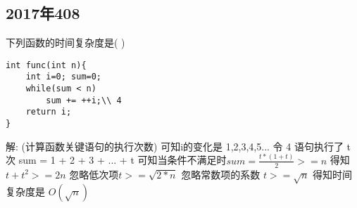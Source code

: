 \subsection{2017年408}
下列函数的时间复杂度是( )
\begin{lstlisting}[basicstyle=\small\ttfamily, caption={}, numbers=none]
int func(int n){
	int i=0; sum=0;
	while(sum < n) 
		sum += ++i;\\ 4
	return i;
}
\end{lstlisting}
解:\newline
{\color{red}(计算函数关键语句的执行次数)}\newline
可知i的变化是 1,2,3,4,5...\newline
令 4 语句执行了 t 次\newline
sum = 1 + 2 + 3 + ... + t \newline
可知当条件不满足时$ sum = \frac{t * (1 + t)}{2} >= n $\newline
得知 $ t + t^2 >= 2n$\newline
忽略低次项$ t >= \sqrt{2*n} $\newline
忽略常数项的系数 $ t >= \sqrt{n}$ \newline
得知时间复杂度是 $ O(\sqrt{n})$






